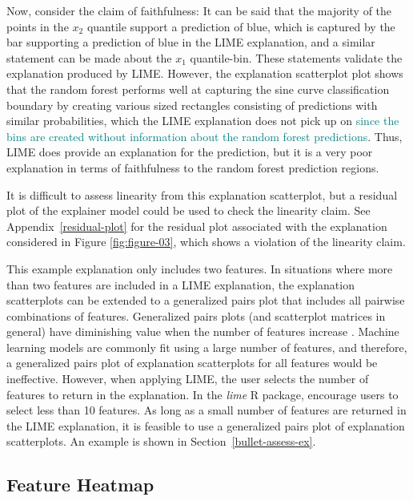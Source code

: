 \documentclass[AMS,STIX2COL]{WileyNJD-v2}\usepackage[]{graphicx}\usepackage[]{color}
\newcommand{\kge}[1]{\textcolor{teal}{#1}}
\begin{document}
Now, consider the claim of faithfulness: It can be said that the majority of the points in the $x_2$ quantile support a prediction of blue, which is captured by the bar supporting a prediction of blue in the LIME explanation, and a similar statement can be made about the $x_1$ quantile-bin. These statements validate the explanation produced by LIME. However, the explanation scatterplot plot shows that the random forest performs well at capturing the sine curve classification boundary by creating various sized rectangles consisting of predictions with similar probabilities, which the LIME explanation does not pick up on \kge{since the bins are created without information about the random forest predictions}. Thus, LIME does provide an explanation for the prediction, but it is a very poor explanation in terms of faithfulness to the random forest prediction regions.

It is difficult to assess linearity from this explanation scatterplot, but a residual plot of the explainer model could be used to check the linearity claim. See Appendix~\ref{residual-plot} for the residual plot associated with the explanation considered in Figure \ref{fig:figure-03}, which shows a violation of the linearity claim.

This example explanation only includes two features. In situations where more than two features are included in a LIME explanation, the explanation scatterplots can be extended to a generalized pairs plot \citep{emerson:2013} that includes all pairwise combinations of features. Generalized pairs plots (and scatterplot matrices in general) have diminishing value when the number of features increase \citep{jensen:2011} \citep{sweller:2011}. Machine learning models are commonly fit using a large number of features, and therefore, a generalized pairs plot of explanation scatterplots for all features would be ineffective. However, when applying LIME, the user selects the number of features to return in the explanation. In the \emph{lime} R package, \citet{pedersen:2020} encourage users to select less than 10 features. As long as a small number of features are returned in the LIME explanation,  it is feasible to use a generalized pairs plot of explanation scatterplots. An example is shown in Section~\ref{bullet-assess-ex}.

\subsection{Feature Heatmap} \label{feat-heat}
\end{document}
